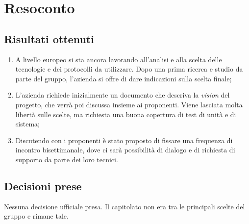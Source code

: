 \section{Resoconto}

\subsection{Risultati ottenuti}
\begin{enumerate}
    \item A livello europeo si sta ancora lavorando all'analisi e alla scelta delle tecnologie e dei protocolli da utilizzare. Dopo una prima ricerca e studio da parte del gruppo, l'azienda si offre di dare indicazioni sulla scelta finale;
    \item L'azienda richiede inizialmente un documento che descriva la \textit{vision} del progetto, che verrà poi discussa insieme ai proponenti. Viene lasciata molta libertà sulle scelte, ma richiesta una buona copertura di test di unità e di sistema;
    \item Discutendo con i proponenti è stato proposto di fissare una frequenza di incontro bisettimanale, dove ci sarà possibilità di dialogo e di richiesta di supporto da parte dei loro tecnici.
\end{enumerate}

\subsection{Decisioni prese}
Nessuna decisione ufficiale presa. Il capitolato non era tra le principali scelte del gruppo e rimane tale.
